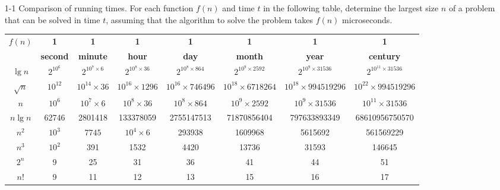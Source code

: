 \documentclass{report}
\makeatletter
\renewenvironment{framed}{%
 \def\FrameCommand##1{\hskip\@totalleftmargin
 \fboxsep=\FrameSep\fbox{##1}}%
 \MakeFramed {\advance\hsize-\width
   \@totalleftmargin\z@ \linewidth\hsize
   \@setminipage}}%
 {\par\unskip\endMakeFramed}
\makeatother
\begin{document}
\begin{enumerate}

\item[1{-}1] Comparison of running times. For each function $f(n)$ and
  time $t$ in the following table, determine the largest size $n$ of a problem
  that can be solved in time $t$, assuming that the algorithm to solve the problem
  takes $f(n)$ microseconds.

\begin{framed}
\centering
\footnotesize
\begin{tabular}{cccccccc}
  \toprule
  \multirow{2}{*}{$f(n)$} & \textbf{1} & \textbf{1} & \textbf{1} & \textbf{1} &
  \textbf{1} & \textbf{1} & \textbf{1}\\
  & \textbf{second} & \textbf{minute} & \textbf{hour} & \textbf{day} &
    \textbf{month} & \textbf{year} & \textbf{century}\\

  \midrule

  $\lg n$ & $2^{10^6}$ & $2^{10^7 \times 6}$ & $2^{10^8 \times 36}$ &
  $2^{10^8 \times 864}$ & $2^{10^9 \times 2592}$ &
  $2^{10^9 \times 31536}$ & $2^{10^{11} \times 31536}$ \\

  $\sqrt{n}$ & $10^{12}$ & $10^{14} \times 36$ & $10^{16} \times 1296$ &
  $10^{16} \times 746496$ & $10^{18} \times 6718264$ &
  $10^{18} \times 994519296$ & $10^{22} \times 994519296$ \\

  $n$ & $10^6$ & $10^7 \times 6$ & $10^8 \times 36$ &
  $10^8 \times 864$ & $10^9 \times 2592$ &
  $10^9 \times 31536$ & $10^{11} \times 31536$ \\

  $n \lg n$ & 62746 & 2801418 & 133378059 & 2755147513 & 71870856404 &
  797633893349 & 68610956750570 \\

  $n^2$ & $10^3$ & $7745$ & $10^4 \times 6$ & 293938 & 1609968 & 5615692 &
  561569229 \\

  $n^3$ & $10^2$ & 391 & 1532 & 4420 & 13736 & 31593 & 146645\\

  $2^n$ & 9 & 25 & 31 & 36 & 41 & 44 & 51\\

  $n!$ & 9 & 11 & 12 & 13 & 15 & 16 & 17\\

  \bottomrule
\end{tabular}
\end{framed}

\end{enumerate}
\end{document}
